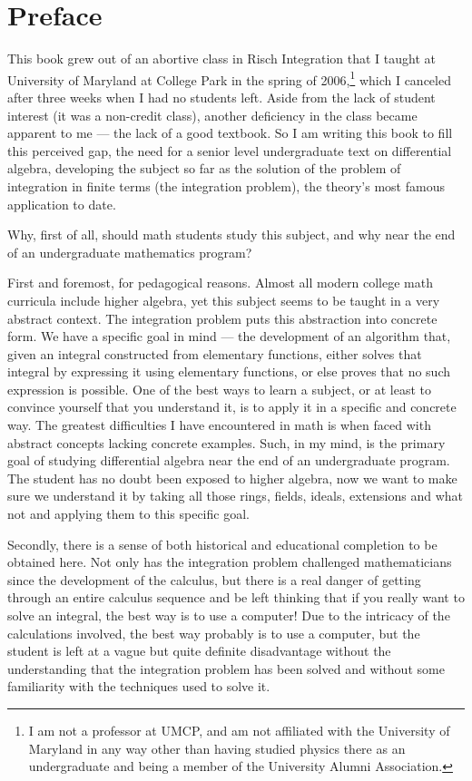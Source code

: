 
\chapter*{Preface}

This book grew out of an abortive class in Risch Integration that I
taught at University of Maryland at College Park in the spring of
2006,\footnote{I am not a professor at UMCP, and am not affiliated
with the University of Maryland in any way other than having studied
physics there as an undergraduate and being a member of the University
Alumni Association.}  which I canceled after three weeks when I
had no students left.  Aside from the lack of student interest (it was
a non-credit class), another deficiency in the class became apparent
to me --- the lack of a good textbook.  So I am writing this book to
fill this perceived gap, the need for a senior level undergraduate
text on differential algebra, developing the subject so far as the
solution of the problem of integration in finite terms (the
integration problem), the theory's most famous application to date.

Why, first of all, should math students study this subject, and why
near the end of an undergraduate mathematics program?

First and foremost, for pedagogical reasons.  Almost all modern
college math curricula include higher algebra, yet this subject seems
to be taught in a very abstract context.  The integration problem puts
this abstraction into concrete form.  We have a specific goal in
mind --- the development of an algorithm that, given an integral
constructed from elementary functions, either solves that integral by
expressing it using elementary functions, or else proves that no such
expression is possible.  One of the best ways to learn a subject, or
at least to convince yourself that you understand it, is to apply it
in a specific and concrete way.  The greatest difficulties I have
encountered in math is when faced with abstract concepts lacking
concrete examples.  Such, in my mind, is the primary goal of studying
differential algebra near the end of an undergraduate program.  The
student has no doubt been exposed to higher algebra, now we want to
make sure we understand it by taking all those rings, fields, ideals,
extensions and what not and applying them to this specific goal.

Secondly, there is a sense of both historical and educational
completion to be obtained here.  Not only has the integration problem
challenged mathematicians since the development of the calculus, but
there is a real danger of getting through an entire calculus sequence
and be left thinking that if you really want to solve an integral, the
best way is to use a computer!  Due to the intricacy of the
calculations involved, the best way probably is to use a computer, but
the student is left at a vague but quite definite disadvantage without
the understanding that the integration problem has been solved and
without some familiarity with the techniques used to solve it.

